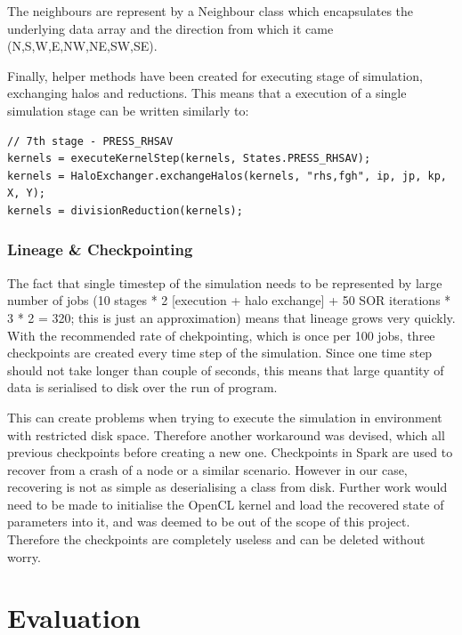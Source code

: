 \documentclass{l4proj}
\begin{document}
The neighbours are represent by a Neighbour class which encapsulates the underlying data
array and the direction from which it came (N,S,W,E,NW,NE,SW,SE).

Finally, helper methods have been created for executing stage of simulation, exchanging halos
and reductions. This means that a execution of a single simulation stage can be written similarly to:

\begin{lstlisting}
// 7th stage - PRESS_RHSAV
kernels = executeKernelStep(kernels, States.PRESS_RHSAV);
kernels = HaloExchanger.exchangeHalos(kernels, "rhs,fgh", ip, jp, kp, X, Y);
kernels = divisionReduction(kernels);
\end{lstlisting}

\subsection{Lineage \& Checkpointing}
\label{chap:lineage_n_checkpointing}

The fact that single timestep of the simulation needs to be represented by
large number of jobs (10 stages * 2 [execution + halo exchange] + 50 SOR iterations * 3
* 2 = 320; this is just an approximation) means that lineage grows very quickly.
With the recommended rate of chekpointing, which is once per 100 jobs, three 
checkpoints are created every time step of the simulation. Since one time step
should not take longer than couple of seconds, this means that large quantity 
of data is serialised to disk over the run of program.

This can create problems when trying to execute the simulation in environment
with restricted disk space. Therefore another workaround was devised, which 
all previous checkpoints before creating a new one. Checkpoints in Spark are used
to recover from a crash of a node or a similar scenario. However in our case,
recovering is not as simple as deserialising a class from disk. Further work
would need to be made to initialise the OpenCL kernel and load the recovered state 
of parameters into it, and was deemed to be out of the scope of this project.
Therefore the checkpoints are completely useless and can be deleted without worry.

\chapter{Evaluation}
\label{chap:eval}
\end{document}

